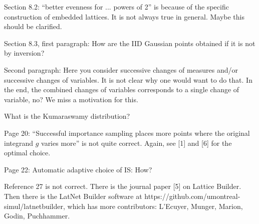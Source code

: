 \documentclass{amsart}
\begin{document}
\vspace{1cm}

Section 8.2: “better evenness for ... powers of 2” is because of the specific construction of embedded lattices. It is not always true in general. Maybe this should be clarified.

\vspace{1cm}

Section 8.3, first paragraph: How are the IID Gaussian points obtained if it is not by inversion?

\vspace{1cm}

Second paragraph: Here you consider successive changes of measures and/or successive changes of variables. It is not clear why one would want to do that. In the end, the combined changes of variables corresponds to a single change of variable, no? We miss a motivation for this.

\vspace{1cm}

What is the Kumaraswamy distribution?

\vspace{1cm}

Page 20: ``Successful importance sampling places more points where the original integrand $g$ varies more'' is not quite correct. Again, see [1] and [6] for the optimal choice.

\vspace{1cm}

Page 22: Automatic adaptive choice of IS: How?

\vspace{1cm}

Reference 27 is not correct. There is the journal paper [5] on Lattice Builder. Then there is the LatNet Builder software at https://github.com/umontreal-simul/latnetbuilder, which has more contributors: L’Ecuyer, Munger, Marion, Godin, Puchhammer.

\vspace{1cm}

%
%
\end{document}
